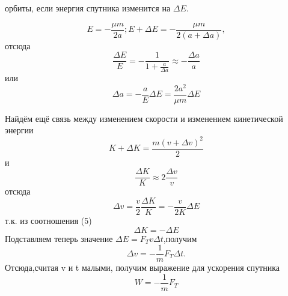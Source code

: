 \leftskip=0cm \rightskip=0cm
\fontsize{14}{10}\selectfont
\begin{minipage}{8cm}
	
	
	орбиты, если энергия спутника изменится на $\Delta E$.
	
	
	\begin{equation}
		E = - \frac{\mu m}{2a}; E + \Delta E = - \frac{\mu m}{2(a + \Delta a)},
	\end{equation}
	отсюда
	\begin{equation}
		\frac{\Delta E}{E} = - \frac{1}{1 + \frac{a}{\Delta a}} \approx -\frac{\Delta a}{a}
	\end{equation}
	или
	\begin{equation}
		\Delta a = - \frac{a}{E}  \Delta E = \frac{2a^2}{\mu m} \Delta E
	\end{equation}
	
	
	\hspace{10mm}Найдём ещё связь между изменением скорости и изменением кинетической энергии 
	\begin{equation}
		K + \Delta K = \frac{m (v + \Delta v)^2}{2}
	\end{equation} 
	и
	\begin{equation}
		\frac{\Delta K}{K} \approx  2 \frac{\Delta v}{v}
	\end{equation} 
	отсюда
	\begin{equation}
		\Delta v = \frac{v}{2} \frac{\Delta K}{K} = -\frac{v}{2K} \Delta E
	\end{equation} 
	т.к. из соотношения (5)
	\begin{equation}
		\Delta K = - \Delta E
	\end{equation}	
	Подставляем теперь значение $\Delta E = F_T v \Delta t$,получим 
	\begin{equation}
		\Delta v = - \frac{1}{m} F_T \Delta t.
	\end{equation} 
	Отсюда,считая v и t малыми, получим выражение для ускорения спутника
	\begin{equation}
		W = - \frac{1}{m} F_T
	\end{equation}
	
\end{minipage}

